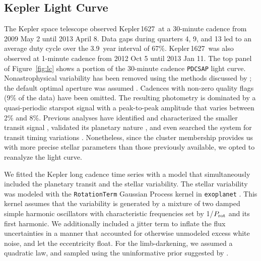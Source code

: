\documentclass[12pt,modern,twocolumn,tighten]{aastex63}
\newcommand{\sn}{Kepler\,1627} %
\begin{document}
\subsection{Kepler Light Curve}

The Kepler space telescope observed \sn\ at a 30-minute cadence from
2009 May 2 until 2013 April 8.  Data gaps during quarters 4, 9, and 13
led to an average duty cycle over the 3.9~year interval of 67\%.  \sn\
was also observed at 1-minute cadence from 2012 Oct 5 until 2013 Jan
11.  The top panel of Figure~\ref{fig:lc} shows a portion of the
30-minute cadence \texttt{PDCSAP} light curve.  Nonastrophysical
variability has been removed using the methods discussed by
\citet{smith_kepler_PDC_2017}; the default optimal aperture was
assumed \citep{smith_finding_2016}.  Cadences with non-zero quality
flags (9\% of the data) have been omitted.  The resulting photometry
is dominated by a quasi-periodic starspot signal with a peak-to-peak
amplitude that varies between 2\% and 8\%.  Previous analyses have
identified and characterized the smaller transit signal
\citep{2012ApJS..199...24T,thompson_planetary_2018}, validated its
planetary nature \citep{morton_false_2016}, and even searched the
system for transit timing variations \citep{holczer_transit_2016}.
Nonetheless, since the cluster membership provides us with more
precise stellar parameters than those previously available, we opted
to reanalyze the light curve.

We fitted the Kepler long cadence time series with a model that
simultaneously included the planetary transit and the stellar
variability.  The stellar variability was modeled with the
\texttt{RotationTerm} Gaussian Process kernel in \texttt{exoplanet}
\citep{exoplanet:exoplanet}.  This kernel assumes that the variability
is generated by a mixture of two damped simple harmonic oscillators
with characteristic frequencies set by 1/$P_{\rm rot}$ and its first
harmonic.  We additionally included a jitter term to inflate the flux
uncertainties in a manner that accounted for otherwise unmodeled
excess white noise, and let the eccentricity float.  For the
limb-darkening, we assumed a quadratic law, and sampled using the
uninformative prior suggested by \citet{exoplanet:kipping13}.
\end{document}
